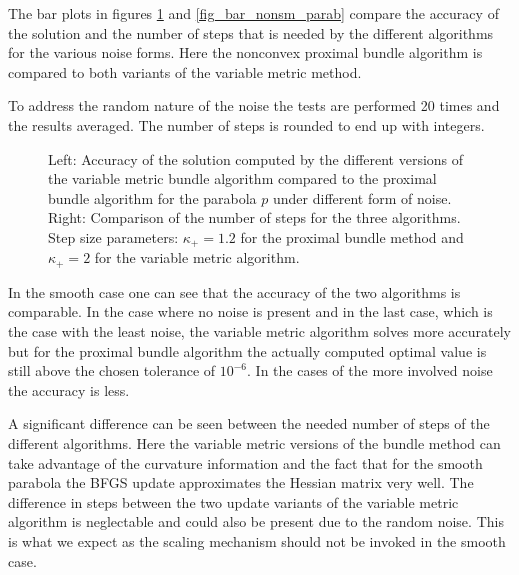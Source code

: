 The bar plots in figures \ref{fig_bar_parab} and \ref{fig_bar_nonsm_parab} compare the accuracy of the solution and the number of steps that is needed by the different algorithms for the various noise forms. Here the nonconvex proximal bundle algorithm is compared to both variants of the variable metric method.

To address the random nature of the noise the tests are performed 20 times and the results averaged. The number of steps is rounded to end up with integers.

\begin{figure}[ht]
	\begin{subfigure}[t]{0.49\textwidth}
	\end{subfigure}
	\begin{subfigure}[t]{0.49\textwidth}
	\end{subfigure}
	\caption[Accuracy and number of steps for the parabola]{Left: Accuracy of the solution computed by the different versions of the variable metric bundle algorithm compared to the proximal bundle algorithm for the parabola \(p\) under different form of noise.\\
	Right: Comparison of the number of steps for the three algorithms.\\
	Step size parameters: \(\kappa_+ = 1.2\) for the proximal bundle method and \(\kappa_+ = 2\) for the variable metric algorithm. }
	\label{fig_bar_parab}
\end{figure}

In the smooth case one can see that the accuracy of the two algorithms is comparable. In the case where no noise is present and in the last case, which is the case with the least noise, the variable metric algorithm solves more accurately but for the proximal bundle algorithm the actually computed optimal value is still above the chosen tolerance of \(10^{-6}\).
In the cases of the more involved noise the accuracy is less.

A significant difference can be seen between the needed number of steps of the different algorithms. Here the variable metric versions of the bundle method can take advantage of the curvature information and the fact that for the smooth parabola the BFGS update approximates the Hessian matrix very well.
The difference in steps between the two update variants of the variable metric algorithm is neglectable and could also be present due to the random noise. This is what we expect as the scaling mechanism should not be invoked in the smooth case.

